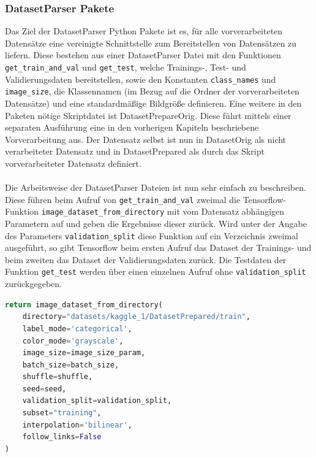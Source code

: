 \documentclass[11pt,bibliography=totocnumbered]{scrartcl}
\begin{document}
\subsubsection{DatasetParser Pakete}
Das Ziel der DatasetParser Python Pakete ist es, für alle vorverarbeiteten Datensätze eine vereinigte Schnittstelle zum Bereitstellen von Datensätzen zu liefern. Diese bestehen aus einer DatasetParser Datei mit den Funktionen \lstinline[language=pythoninline]|get_train_and_val| und \lstinline[language=pythoninline]|get_test|, welche Trainings-, Test- und Validierungsdaten bereitstellen, sowie den Konstanten \lstinline[language=pythoninline]|class_names| und \lstinline[language=pythoninline]|image_size|, die Klassennamen (im Bezug auf die Ordner der vorverarbeiteten Datensätze) und eine standardmäßige Bildgröße definieren. Eine weitere in den Paketen nötige Skriptdatei ist DatasetPrepareOrig. Diese führt mittels einer separaten Ausführung eine in den vorherigen Kapiteln beschriebene Vorverarbeitung aus. Der Datensatz selbst ist nun in DatasetOrig als nicht verarbeiteter Datensatz und in DatasetPrepared als durch das Skript vorverarbeiteter Datensatz definiert.
\\\\
Die Arbeitsweise der DatasetParser Dateien ist nun sehr einfach zu beschreiben. Diese führen beim Aufruf von \lstinline[language=pythoninline]|get_train_and_val| zweimal die Tensorflow-Funktion \lstinline[language=pythoninline]|image_dataset_from_directory| mit vom Datensatz abhängigen Parametern auf und geben die Ergebnisse dieser zurück. Wird unter der Angabe des Parameters \lstinline[language=pythoninline]|validation_split| diese Funktion auf ein Verzeichnis zweimal ausgeführt, so gibt Tensorflow beim ersten Aufruf das Dataset der Trainings- und beim zweiten das Dataset der Validierungsdaten zurück. Die Testdaten der Funktion \lstinline[language=pythoninline]|get_test| werden über einen einzelnen Aufruf ohne \lstinline[language=pythoninline]|validation_split| zurückgegeben.
\begin{lstlisting}[language=python,firstnumber=1,caption={Beispielhafter Aufruf der Funktion zum Einlesen von Daten},label=lst:dataset]
return image_dataset_from_directory(
	directory="datasets/kaggle_1/DatasetPrepared/train",
	label_mode='categorical',
	color_mode='grayscale',
	image_size=image_size_param,
	batch_size=batch_size,
	shuffle=shuffle,
	seed=seed,
	validation_split=validation_split,
	subset="training",
	interpolation='bilinear',
	follow_links=False
)
\end{lstlisting}
\end{document}
